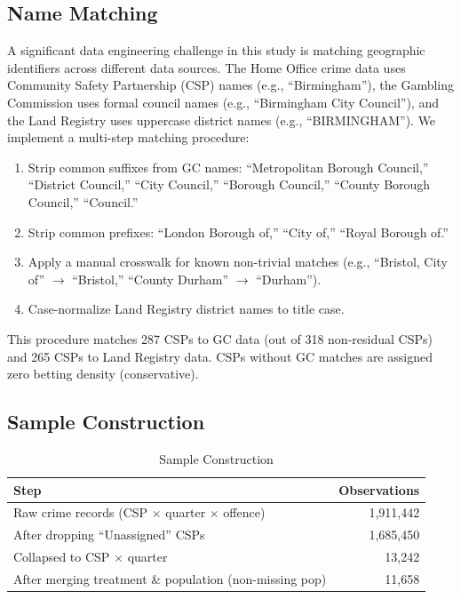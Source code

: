 \documentclass[12pt]{article}
\begin{document}
\subsection{Name Matching}

A significant data engineering challenge in this study is matching geographic identifiers across different data sources. The Home Office crime data uses Community Safety Partnership (CSP) names (e.g., ``Birmingham''), the Gambling Commission uses formal council names (e.g., ``Birmingham City Council''), and the Land Registry uses uppercase district names (e.g., ``BIRMINGHAM''). We implement a multi-step matching procedure:

\begin{enumerate}
\item Strip common suffixes from GC names: ``Metropolitan Borough Council,'' ``District Council,'' ``City Council,'' ``Borough Council,'' ``County Borough Council,'' ``Council.''
\item Strip common prefixes: ``London Borough of,'' ``City of,'' ``Royal Borough of.''
\item Apply a manual crosswalk for known non-trivial matches (e.g., ``Bristol, City of'' $\to$ ``Bristol,'' ``County Durham'' $\to$ ``Durham'').
\item Case-normalize Land Registry district names to title case.
\end{enumerate}

This procedure matches 287 CSPs to GC data (out of 318 non-residual CSPs) and 265 CSPs to Land Registry data. CSPs without GC matches are assigned zero betting density (conservative).

\subsection{Sample Construction}

\begin{table}[H]
\centering
\caption{Sample Construction}
\begin{tabular}{lr}
\toprule
Step & Observations \\
\midrule
Raw crime records (CSP $\times$ quarter $\times$ offence) & 1,911,442 \\
After dropping ``Unassigned'' CSPs & 1,685,450 \\
Collapsed to CSP $\times$ quarter & 13,242 \\
After merging treatment \& population (non-missing pop) & 11,658 \\
\bottomrule
\end{tabular}
\end{table}
\end{document}
